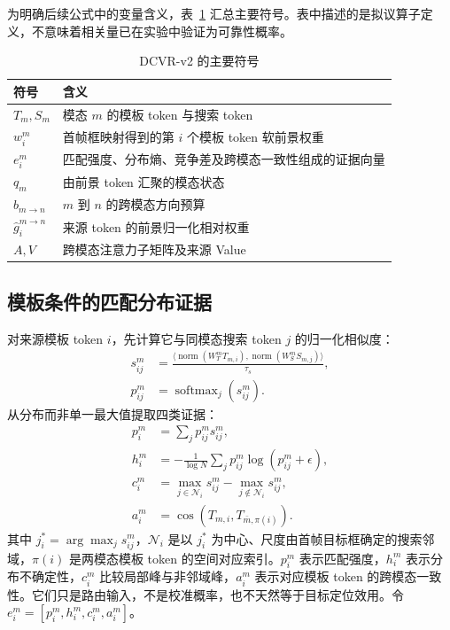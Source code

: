 \documentclass[journal]{IEEEtran}
\newcommand{\softmax}{\operatorname{softmax}}
\begin{document}
为明确后续公式中的变量含义，表~\ref{tab:notation} 汇总主要符号。表中描述的是拟议算子定义，不意味着相关量已在实验中验证为可靠性概率。
\begin{table}[!t]
\centering
\caption{DCVR-v2 的主要符号}
\label{tab:notation}
\small
\begin{tabular}{@{}p{1.8cm}p{4.9cm}@{}}
\toprule
符号 & 含义 \\
\midrule
$T_m,S_m$ & 模态 $m$ 的模板 token 与搜索 token \\
$w_i^m$ & 首帧框映射得到的第 $i$ 个模板 token 软前景权重 \\
$e_i^m$ & 匹配强度、分布熵、竞争差及跨模态一致性组成的证据向量 \\
$q_m$ & 由前景 token 汇聚的模态状态 \\
$b_{m\rightarrow n}$ & $m$ 到 $n$ 的跨模态方向预算 \\
$\hat g_i^{m\rightarrow n}$ & 来源 token 的前景归一化相对权重 \\
$A,V$ & 跨模态注意力子矩阵及来源 Value \\
\bottomrule
\end{tabular}
\end{table}

\subsection{模板条件的匹配分布证据}
对来源模板 token $i$，先计算它与同模态搜索 token $j$ 的归一化相似度：
\begin{align}
 s_{ij}^{m}&=\frac{\langle \operatorname{norm}(W_T^mT_{m,i}),
                   \operatorname{norm}(W_S^mS_{m,j})\rangle}{\tau_s},\\
 p_{ij}^{m}&=\softmax_j(s_{ij}^{m}).
\end{align}
从分布而非单一最大值提取四类证据：
\begin{align}
 p_i^m &= \sum_j p_{ij}^m s_{ij}^m, \\
 h_i^m &= -\frac{1}{\log N}\sum_j p_{ij}^m\log(p_{ij}^m+\epsilon), \\
 c_i^m &= \max_{j\in\mathcal{N}_i}s_{ij}^m-\max_{j\notin\mathcal{N}_i}s_{ij}^m, \\
 a_i^m &= \operatorname{cos}(T_{m,i},T_{\bar m,\pi(i)}).
\end{align}
其中 $j_i^*=\arg\max_j s_{ij}^m$，$\mathcal{N}_i$ 是以 $j_i^*$ 为中心、尺度由首帧目标框确定的搜索邻域，$\pi(i)$ 是两模态模板 token 的空间对应索引。$p_i^m$ 表示匹配强度，$h_i^m$ 表示分布不确定性，$c_i^m$ 比较局部峰与非邻域峰，$a_i^m$ 表示对应模板 token 的跨模态一致性。它们只是路由输入，不是校准概率，也不天然等于目标定位效用。令 $e_i^m=[p_i^m,h_i^m,c_i^m,a_i^m]$。
\end{document}
